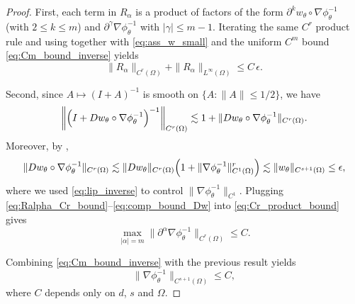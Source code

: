 \documentclass[10pt,a4paper]{amsart}
\begin{document}
\begin{proof}
First, each term in $R_\alpha$ is a product of factors of the form $\partial^k w_\theta\circ\nabla\phi_\theta^{-1}$
(with $2\le k\le m$) and $\partial^\gamma \nabla\phi_\theta^{-1}$ with $|\gamma|\le m-1$.
Iterating the same $C^r$ product rule and using  together with
\eqref{eq:ass_w_small} and the uniform $C^m$ bound \eqref{eq:Cm_bound_inverse} yields
\begin{equation}
\label{eq:Ralpha_Cr_bound}
\|R_\alpha\|_{C^r(\Omega)} + \|R_\alpha\|_{L^\infty(\Omega)} \le C\,\epsilon.
\end{equation}

Second, since $A\mapsto(I+A)^{-1}$ is smooth on $\{A:\|A\|\le 1/2\}$, we have
\begin{equation}
\label{eq:inverse_map_bound}
\left\|\Bigl(I+Dw_\theta\circ\nabla\phi_\theta^{-1}\Bigr)^{-1}\right\|_{C^r(\Omega)}
\lesssim
1 + \|Dw_\theta\circ\nabla\phi_\theta^{-1}\|_{C^r(\Omega)}.
\end{equation}
Moreover, by ,
\begin{equation}
\label{eq:comp_bound_Dw}
\|Dw_\theta\circ\nabla\phi_\theta^{-1}\|_{C^r(\Omega)}
\lesssim
\|Dw_\theta\|_{C^r(\Omega)}\Bigl(1+\|\nabla\phi_\theta^{-1}\|_{C^{1}(\Omega)}^{r}\Bigr)
\lesssim
\|w_\theta\|_{C^{s+1}(\Omega)}
\le \epsilon,
\end{equation}
where we used \eqref{eq:lip_inverse} to control $\|\nabla\phi_\theta^{-1}\|_{C^1}$.
Plugging \eqref{eq:Ralpha_Cr_bound}--\eqref{eq:comp_bound_Dw} into \eqref{eq:Cr_product_bound} gives
\begin{equation}
\max_{|\alpha|=m}\|\partial^\alpha \nabla\phi_\theta^{-1}\|_{C^r(\Omega)} \le C.
\end{equation}


Combining \eqref{eq:Cm_bound_inverse} with the previous result yields
\begin{equation}
\|\nabla\phi_\theta^{-1}\|_{C^{s+1}(\Omega)} \le C,
\end{equation}
where $C$ depends only on $d$, $s$ and $\Omega$.
\end{proof}
\end{document}
